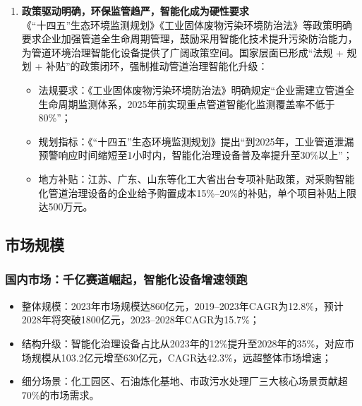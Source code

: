 \documentclass[12pt, a4paper]{article}
\begin{document}
\begin{enumerate}
  \item \textbf{政策驱动明确，环保监管趋严，智能化成为硬性要求}\\
  《“十四五”生态环境监测规划》《工业固体废物污染环境防治法》等政策明确要求企业加强管道全生命周期管理，鼓励采用智能化技术提升污染防治能力，为管道环境治理智能化设备提供了广阔政策空间。国家层面已形成“法规 + 规划 + 补贴”的政策闭环，强制推动管道治理智能化升级：
  \begin{itemize}
    \item 法规要求：《工业固体废物污染环境防治法》明确规定“企业需建立管道全生命周期监测体系，2025年前实现重点管道智能化监测覆盖率不低于80\%”；
    \item 规划指标：《“十四五”生态环境监测规划》提出“到2025年，工业管道泄漏预警响应时间缩短至1小时内，智能化治理设备普及率提升至30\%以上”；
    \item 地方补贴：江苏、广东、山东等化工大省出台专项补贴政策，对采购智能化管道治理设备的企业给予购置成本15\%--20\%的补贴，单个项目补贴上限达500万元。
  \end{itemize}
\end{enumerate}

\subsection{市场规模}

\subsubsection{国内市场：千亿赛道崛起，智能化设备增速领跑}

\begin{itemize}
  \item 整体规模：2023年市场规模达860亿元，2019--2023年CAGR为12.8\%，预计2028年将突破1800亿元，2023--2028年CAGR为15.7\%；
  \item 结构升级：智能化治理设备占比从2023年的12\%提升至2028年的35\%，对应市场规模从103.2亿元增至630亿元，CAGR达42.3\%，远超整体市场增速；
  \item 细分场景：化工园区、石油炼化基地、市政污水处理厂三大核心场景贡献超70\%的市场需求。
\end{itemize}

\end{document}

